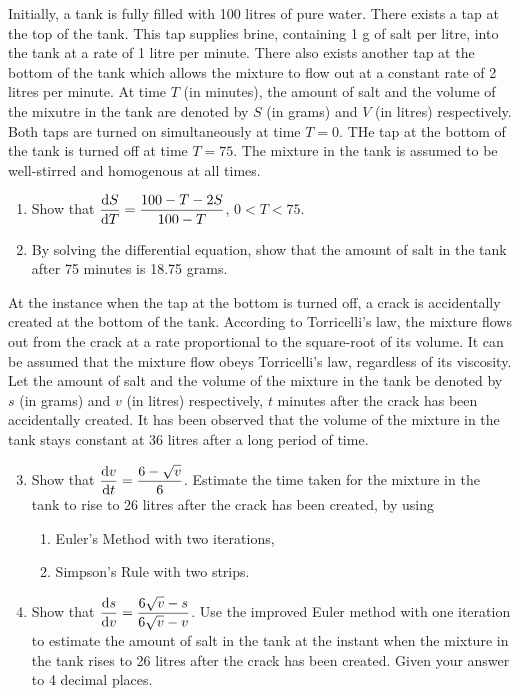 \documentclass{echw}
\begin{document}
    \problem{}
        Initially, a tank is fully filled with 100 litres of pure water. There exists a tap at the top of the tank. This tap supplies brine, containing 1 g of salt per litre, into the tank at a rate of 1 litre per minute. There also exists another tap at the bottom of the tank which allows the mixture to flow out at a constant rate of 2 litres per minute. At time $T$ (in minutes), the amount of salt and the volume of the mixutre in the tank are denoted by $S$ (in grams) and $V$ (in litres) respectively. Both taps are turned on simultaneously at time $T = 0$. THe tap at the bottom of the tank is turned off at time $T = 75$. The mixture in the tank is assumed to be well-stirred and homogenous at all times.
        \begin{enumerate}
            \item Show that $\dfrac{\mathrm{d} S}{\mathrm{d} T} = \dfrac{100-T-2S}{100-T}$, $0 < T < 75$.
            \item By solving the differential equation, show that the amount of salt in the tank after 75 minutes is 18.75 grams.
        \end{enumerate}
        At the instance when the tap at the bottom is turned off, a crack is accidentally created at the bottom of the tank. According to Torricelli's law, the mixture flows out from the crack at a rate proportional to the square-root of its volume. It can be assumed that the mixture flow obeys Torricelli's law, regardless of its viscosity. Let the amount of salt and the volume of the mixture in the tank be denoted by $s$ (in grams) and $v$ (in litres) respectively, $t$ minutes after the crack has been accidentally created. It has been observed that the volume of the mixture in the tank stays constant at 36 litres after a long period of time.
        \begin{enumerate}
            \setcounter{enumi}{2}
            \item Show that $\dfrac{\mathrm{d} v}{\mathrm{d} t} = \dfrac{6-\sqrt{v}}{6}$. Estimate the time taken for the mixture in the tank to rise to 26 litres after the crack has been created, by using
            \begin{enumerate}
                \item Euler's Method with two iterations,
                \item Simpson's Rule with two strips.
            \end{enumerate}
            \item Show that $\dfrac{\mathrm{d} s}{\mathrm{d} v} = \dfrac{6\sqrt{v} - s}{6\sqrt{v} - v}$. Use the improved Euler method with one iteration to estimate the amount of salt in the tank at the instant when the mixture in the tank rises to 26 litres after the crack has been created. Given your answer to 4 decimal places.
        \end{enumerate}
\end{document}
